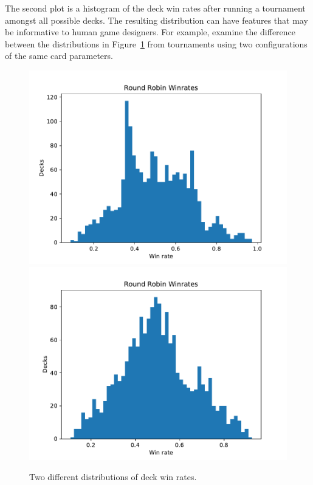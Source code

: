 The second plot is a histogram of the deck win rates after running a tournament amongst all possible decks. %
The resulting distribution can have features that may be informative to human game designers. For example, examine the difference between the distributions %
in Figure~\ref{fig:special_only_dist} from tournaments using two configurations of the same card parameters. 

\begin{figure}[t]
	\includegraphics[scale=0.5]{special_only_4_5_8_8_4_8_3_3_3_5}
	\includegraphics[scale=0.5]{special_only_1_3_4_3_3_1_7_8_5_7}
	\caption{Two different distributions of deck win rates.}
	\label{fig:special_only_dist}
\end{figure}

